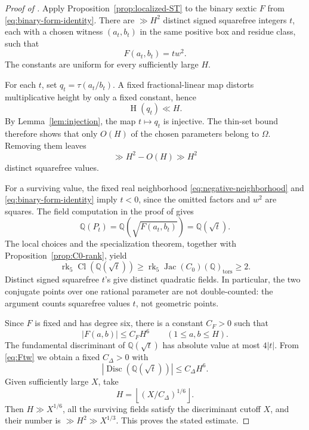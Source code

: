 \documentclass[11pt,reqno]{amsart}
\theoremstyle{definition}
\theoremstyle{remark}
\newcommand{\Q}{\mathbb{Q}}
\newcommand{\Cl}{\operatorname{Cl}}
\newcommand{\Disc}{\operatorname{Disc}}
\newcommand{\Jac}{\operatorname{Jac}}
\newcommand{\rk}{\operatorname{rk}}
\newcommand{\Ht}{\operatorname{H}}
\begin{document}
\begin{proof}[Proof of ]
Apply Proposition~\ref{prop:localized-ST} to the binary sextic \(F\) from
\eqref{eq:binary-form-identity}.  There are \(\gg H^2\) distinct signed
squarefree integers \(t\), each with a chosen witness \((a_t,b_t)\) in the
same positive box and residue class, such that
\begin{equation}\label{eq:Ftw}
  F(a_t,b_t)=t w^2.
\end{equation}
The constants are uniform for every sufficiently large \(H\).

For each \(t\), set \(q_t=\tau(a_t/b_t)\).  A fixed fractional-linear map
distorts multiplicative height by only a fixed constant, hence
\begin{equation}\label{eq:height-distortion}
  \Ht(q_t)\ll H.
\end{equation}
By Lemma~\ref{lem:injection}, the map \(t\mapsto q_t\) is injective.  The thin-set
bound \cite[Lemma~3.2]{KulkarniLevin2022} therefore shows that only \(O(H)\)
of the chosen parameters belong to \(\Omega\).  Removing them leaves
\begin{equation}\label{eq:after-deletion}
  \gg H^2-O(H)\gg H^2
\end{equation}
distinct squarefree values.

For a surviving value, the fixed real neighborhood
\eqref{eq:negative-neighborhood} and
\eqref{eq:binary-form-identity} imply \(t<0\), since the omitted factors and
\(w^2\) are squares.  The field computation in the proof of
\cite[Theorem~1.2, equations~(3.1)--(3.2)]{KulkarniLevin2022} gives
\begin{equation}\label{eq:field-identification}
  \Q(P_t)=\Q(\sqrt{F(a_t,b_t)})=\Q(\sqrt t).
\end{equation}
The local choices and the specialization theorem, together with
Proposition~\ref{prop:C0-rank}, yield
\begin{equation}\label{eq:rank-conclusion}
  \rk_5\Cl(\Q(\sqrt t))
  \geq \rk_5\Jac(C_0)(\Q)_{\mathrm{tors}}
  \geq2.
\end{equation}
Distinct signed squarefree \(t\)'s give distinct quadratic fields.  In
particular, the two conjugate points over one rational parameter are not
double-counted: the argument counts squarefree values \(t\), not geometric
points.

Since \(F\) is fixed and has degree six, there is a constant \(C_F>0\) such
that
\[
  |F(a,b)|\leq C_FH^6
  \qquad(1\leq a,b\leq H).
\]
The fundamental discriminant of \(\Q(\sqrt t)\) has absolute value at most
\(4|t|\).  From \eqref{eq:Ftw} we obtain a fixed \(C_\Delta>0\) with
\begin{equation}\label{eq:disc-height}
  |\Disc(\Q(\sqrt t))|\leq C_\Delta H^6.
\end{equation}
Given sufficiently large \(X\), take
\[
  H=\left\lfloor (X/C_\Delta)^{1/6}\right\rfloor.
\]
Then \(H\gg X^{1/6}\), all the surviving fields satisfy the discriminant
cutoff \(X\), and their number is \(\gg H^2\gg X^{1/3}\).  This proves the
stated estimate.
\end{proof}
\end{document}
